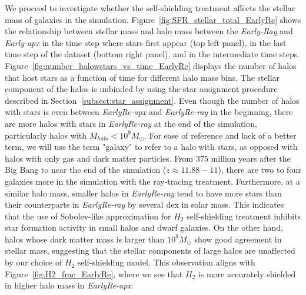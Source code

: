 \documentclass[linenumbers, twocolumn]{aastex631}
\begin{document}
We proceed to investigate whether the self-shielding treatment affects the stellar mass of galaxies in the simulation. Figure~\ref{fig:SFR_stellar_total_EarlyRe} shows the relationship between stellar mass and halo mass between the \textit{Early-Ray} and \textit{Early-apx} in the time step where stars first appear (top left panel), in the last time step of the dataset (bottom right panel), and in the intermediate time steps. Figure~\ref{fig:number_halowstars_vs_time_EarlyRe} displays the number of halos that host stars as a function of time for different halo mass bins. The stellar component of the halos is unbinded by using the star assignment procedure described in Section~\ref{subsect:star_assignment}. Even though the number of halos with stars is even between \textit{EarlyRe-apx} and \textit{EarlyRe-ray} in the beginning, there are more halos with stars in \textit{EarlyRe-ray} at the end of the simulation, particularly halos with $M_{halo} < 10^{9} M_\odot$. For ease of reference and lack of a better term, we will use the term "galaxy" to refer to a halo with stars, as opposed with halos with only gas and dark matter particles. From 375 million years after the Big Bang to near the end of the simulation ($z \approx 11.88 - 11$), there are two to four galaxies more in the simulation with the ray-tracing treatment. Furthermore, at a similar halo mass, smaller halos in \textit{EarlyRe-ray} tend to have more stars than their counterparts in \textit{EarlyRe-ray} by several dex in solar mass. This indicates that the use of Sobolev-like approximation for $H_{2}$ self-shielding treatment inhibits star formation activity in small halos and dwarf galaxies. On the other hand, halos whose dark matter mass is larger than $10^{9} M_\odot$ show good agreement in stellar mass, suggesting that the stellar components of large halos are unaffected by our choice of $H_{2}$ self-shielding model. This observation aligns with Figure~\ref{fig:H2_frac_EarlyRe}, where we see that $H_{2}$ is more accurately shielded in higher halo mass in \textit{EarlyRe-apx}.
\end{document}
